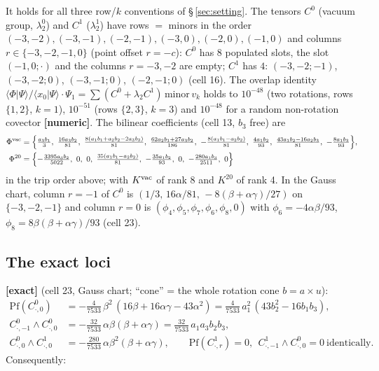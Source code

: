 \documentclass[10pt]{article}
\newcommand{\Pf}{\mathrm{Pf}}
\begin{document}
It holds for all three row/$k$ conventions of \S\,\ref{sec:setting}. The tensors $C^0$ (vacuum group, $\lambda_2^0$) and $C^1$ ($\lambda_2^1$) have rows $=$ minors in the order $(-3,-2),(-3,-1),(-2,-1),(-3,0),(-2,0),(-1,0)$ and columns $r\in\{-3,-2,-1,0\}$ (point offset $r=-c$): $C^0$ has $8$ populated slots, the slot $(-1,0;\cdot)$ and the columns $r=-3,-2$ are empty; $C^1$ has $4$: $(-3,-2;-1)$, $(-3,-2;0)$, $(-3,-1;0)$, $(-2,-1;0)$ (cell 16). The overlap identity $\langle\Phi|\Psi\rangle/\langle x_0|\Psi\rangle\cdot\Psi_1=\sum(C^0+\lambda_2C^1)\,\mathrm{minor}\,v_k$ holds to $10^{-48}$ (two rotations, rows $\{1,2\}$, $k=1$), $10^{-51}$ (rows $\{2,3\}$, $k=3$) and $10^{-48}$ for a random non-rotation covector \textbf{[numeric]}. The bilinear coefficients (cell 13, $b_3$ free) are
\begin{align*}
\Phi^{\rm vac}&=\Bigl\{\tfrac{a_3b_1}{3},\ \tfrac{16a_3b_2}{81},\ \tfrac{8(a_1b_1+a_2b_2-2a_3b_3)}{81},\ \tfrac{62a_2b_1+27a_3b_2}{186},\ -\tfrac{8(a_1b_1-a_2b_2)}{81},\ \tfrac{4a_1b_2}{93},\ \tfrac{43a_1b_2-16a_2b_3}{81},\ -\tfrac{8a_1b_3}{93}\Bigr\},\\
\Phi^{20}&=\Bigl\{-\tfrac{3395a_3b_2}{5022},\ 0,\ 0,\ \tfrac{35(a_1b_1-a_2b_2)}{81},\ -\tfrac{35a_1b_2}{93},\ 0,\ -\tfrac{280a_1b_3}{2511},\ 0\Bigr\}
\end{align*}
in the trip order above; with $K^{\rm vac}$ of rank 8 and $K^{20}$ of rank 4. In the Gauss chart, column $r=-1$ of $C^0$ is $(1/3,\,16\alpha/81,\,-8(\beta+\alpha\gamma)/27)$ on $\{-3,-2,-1\}$ and column $r=0$ is $(\phi_4,\phi_5,\phi_7,\phi_6,\phi_8,0)$ with $\phi_6=-4\alpha\beta/93$, $\phi_8=8\beta(\beta+\alpha\gamma)/93$ (cell 23).

\subsection{The exact loci}\label{sec:adjloci}

\textbf{[exact]} (cell 23, Gauss chart; ``cone'' = the whole rotation cone $b=a\times u$):
\begin{align*}
\Pf(C^0_{\cdot,0})&=-\tfrac{4}{7533}\,\beta^2\,(16\beta+16\alpha\gamma-43\alpha^2)=\tfrac{4}{7533}\,a_1^2\,(43b_2^2-16b_1b_3),\\
C^0_{\cdot,-1}\wedge C^0_{\cdot,0}&=-\tfrac{32}{7533}\,\alpha\beta(\beta+\alpha\gamma)=\tfrac{32}{7533}\,a_1a_3b_2b_3,\\
C^0_{\cdot,0}\wedge C^1_{\cdot,0}&=-\tfrac{280}{7533}\,\alpha\beta^2(\beta+\alpha\gamma),\qquad \Pf(C^1_{\cdot,r})=0,\ \ C^1_{\cdot,-1}\wedge C^0_{\cdot,0}=0\ \text{identically.}
\end{align*}
Consequently:
\end{document}
